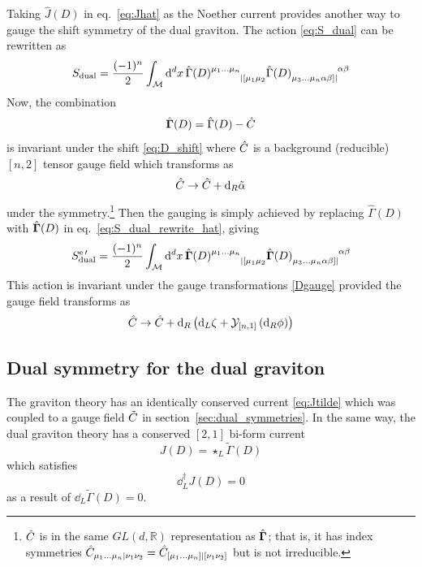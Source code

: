 Taking $\hat{J}(D)$ in eq.~\eqref{eq:Jhat} as the Noether current provides another way to gauge the shift symmetry of the dual graviton. The action \eqref{eq:S_dual} can be rewritten as
\begin{equation}\label{eq:S_dual_rewrite_hat}
    S_{\text{dual}} = \frac{(-1)^n}{2} \int_{\mathcal{M}} \dd[d]{x} \hat{\Gamma}(D)\indices{^{\mu_1\dots\mu_n}_{|[\mu_1\mu_2}} \hat{\Gamma}(D)\indices{_{\mu_3\dots\mu_n \alpha\beta]|}^{\alpha\beta}}
\end{equation}
Now, the combination
\begin{equation}
    \hat{\mathbf{\Gamma}}(D) = \hat{\Gamma}(D) - \hat{C}
\end{equation}
is invariant under the shift \eqref{eq:D_shift} where $\hat{C}$ is a background (reducible) $[n,2]$ tensor gauge field which transforms as
\begin{equation}
    \hat{C} \to \hat{C} + \dd_R \tilde{\alpha}
\end{equation}
under the symmetry.\footnote{$\hat{C}$ is in the same $GL(d,\mathbb{R})$ representation as $\hat{\mathbf{\Gamma}}$; that is, it has index symmetries $\hat{C}_{\mu_1\dots\mu_n|\nu_1\nu_2} = \hat{C}_{[\mu_1\dots\mu_n]|[\nu_1\nu_2]}$ but is not irreducible.} Then the gauging is simply achieved by replacing $\hat{\Gamma}(D)$ with $\hat{\mathbf{\Gamma}}(D)$ in eq.~\eqref{eq:S_dual_rewrite_hat}, giving
\begin{equation}
    S_{\text{dual}}^{\text{e}\,\prime} = \frac{(-1)^n}{2} \int_{\mathcal{M}} \dd[d]{x} \hat{\ggamma}(D)\indices{^{\mu_1\dots\mu_n}_{|[\mu_1\mu_2}} \hat{\ggamma}(D)\indices{_{\mu_3\dots\mu_n \alpha\beta]|}^{\alpha\beta}}
\end{equation}
This action is invariant under the gauge transformations \eqref{Dgauge} provided the gauge field transforms as 
\begin{equation}
    \hat{C}\to \hat{C} + \dd_R  \left( \dd_L \zeta + \mathcal{Y}_{[n,1]} \left(\dd_R \phi\right) \right)
\end{equation}

\subsection{Dual symmetry for the dual graviton}

The graviton theory has an identically conserved current \eqref{eq:Jtilde} which was coupled to a gauge field $\tilde{C}$ in section~\ref{sec:dual_symmetries}.
In the same way, the dual graviton theory has
a conserved $[2,1]$ bi-form current
\begin{equation}\label{eq:JD}
     {J}(D) = \star_L \tilde \Gamma(D)
\end{equation}
which satisfies
\begin{equation}
    \dd^\dag_L J(D) = 0
\end{equation}
as a result of $\dd_L \tilde\Gamma(D) = 0$.

